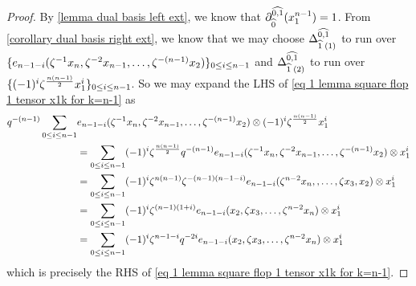 \begin{proof}
    By \cref{lemma dual basis left ext}, we know that $\partial^{\widehat{0,1}}_{\widehat{0}}(x_1^{n-1})=1$. 
    From \cref{corollary dual basis right ext}, we know that we may choose
    $\Delta^{\widehat{0,1}}_{\widehat{1}\;(1)}$ to run over $\{e_{n-1-i}(\zeta^{-1} x_{n}, \zeta^{-2}x_{n-1},\ldots, \zeta^{-(n-1)}x_2 )\}_{0 \leq i \leq n-1}$ and $\Delta^{\widehat{0,1}}_{\widehat{1}\;(2)}$ to run over $\{(-1)^i\zeta^{\frac{n(n-1)}{2}}x_1^i\}_{0\leq i \leq n-1}$.
    So we may expand the LHS of \cref{eq 1 lemma square flop 1 tensor x1k for k=n-1} as
    \begin{align}
        \nonumber q^{-(n-1)}\sum_{0\leq i \leq n-1}&e_{n-1-i}(\zeta^{-1} x_{n}, \zeta^{-2}x_{n-1},\ldots, \zeta^{-(n-1)}x_2 )\otimes (-1)^i\zeta^{\frac{n(n-1)}{2}}x_1^i\\
       \nonumber &=\sum_{0 \leq i\leq n-1}(-1)^i\zeta^{\frac{n(n-1)}{2}}q^{-(n-1)}e_{n-1-i}(\zeta^{-1} x_{n}, \zeta^{-2}x_{n-1},\ldots, \zeta^{-(n-1)}x_2 )\otimes x_1^i\\
       \notag &=\sum_{0\leq i \leq n-1}(-1)^i\zeta^{n(n-1)}\zeta^{-(n-1)(n-1-i)}e_{n-1-i}(\zeta^{n-2} x_{n}, ,\ldots, \zeta x_3, x_2 ) \otimes x_1^i\\
       \notag  &=\sum_{0 \leq i \leq n-1} (-1)^i\zeta^{(n-1)(1+i)}e_{n-1-i}(x_2, \zeta x_3, \ldots, \zeta^{n-2}x_{n} ) \otimes x_1^i\\
       \notag &=\sum_{0 \leq i \leq n-1} (-1)^i\zeta^{n-1-i}q^{-2i}e_{n-1-i}(x_2, \zeta x_3, \ldots, \zeta^{n-2}x_{n} ) \otimes x_1^i
    \end{align}
    which is precisely the RHS of \cref{eq 1 lemma square flop 1 tensor x1k for k=n-1}.
\end{proof}